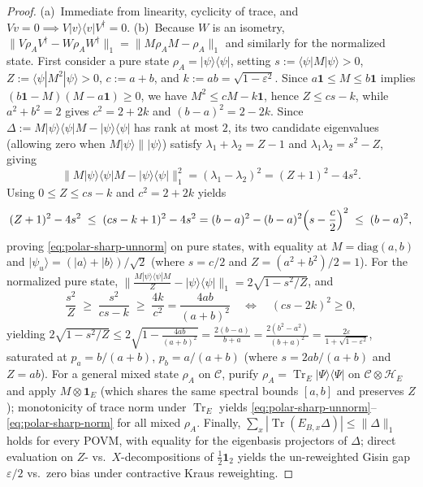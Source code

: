 \documentclass[11pt,a4paper]{article}
\theoremstyle{definition}
\theoremstyle{remark}
\newcommand{\Tr}{\operatorname{Tr}}
\newcommand{\cH}{\mathcal{H}}
\newcommand{\cC}{\mathcal{C}}
\newcommand{\1}{\mathbf{1}}
\newcommand{\normTr}[1]{\|#1\|_1}
\begin{document}
\begin{proof}
(a)~Immediate from linearity, cyclicity of trace, and $V v = 0\implies V|v\rangle\langle v|V^\dagger=0$.
(b)~Because $W$ is an isometry, $\normTr{V\rho_A V^\dagger - W\rho_A W^\dagger}=\normTr{M\rho_A M - \rho_A}$ and similarly for the normalized state. First consider a pure state $\rho_A=|\psi\rangle\langle\psi|$, setting $s:=\langle\psi|M|\psi\rangle>0$, $Z:=\langle\psi|M^2|\psi\rangle>0$, $c:=a+b$, and $k:=ab=\sqrt{1-\varepsilon^2}$. Since $a\1\le M\le b\1$ implies $(b\1-M)(M-a\1)\ge 0$, we have $M^2\le c M - k\1$, hence $Z\le c s - k$, while $a^2+b^2=2$ gives $c^2=2+2k$ and $(b-a)^2=2-2k$. Since $\Delta:=M|\psi\rangle\langle\psi|M-|\psi\rangle\langle\psi|$ has rank at most $2$, its two candidate eigenvalues (allowing zero when $M|\psi\rangle\parallel|\psi\rangle$) satisfy $\lambda_1+\lambda_2=Z-1$ and $\lambda_1\lambda_2 = s^2 - Z$, giving
\begin{equation*}
  \normTr{M|\psi\rangle\langle\psi|M - |\psi\rangle\langle\psi|}^2
  = (\lambda_1-\lambda_2)^2 = (Z+1)^2 - 4 s^2.
\end{equation*}
Using $0\le Z\le c s - k$ and $c^2=2+2k$ yields
\begin{equation*}
  (Z+1)^2 - 4 s^2 \;\le\; (c s - k + 1)^2 - 4 s^2
  = (b-a)^2 - (b-a)^2\Bigl(s-\frac{c}{2}\Bigr)^2 \;\le\; (b-a)^2,
\end{equation*}
proving \eqref{eq:polar-sharp-unnorm} on pure states, with equality at $M=\mathrm{diag}(a,b)$ and $|\psi_u\rangle=(|a\rangle+|b\rangle)/\sqrt{2}$ (where $s=c/2$ and $Z=(a^2+b^2)/2=1$). For the normalized pure state, $\normTr{\frac{M|\psi\rangle\langle\psi|M}{Z}-|\psi\rangle\langle\psi|}=2\sqrt{1-s^2/Z}$, and
\begin{equation*}
  \frac{s^2}{Z} \;\ge\; \frac{s^2}{c s - k} \;\ge\; \frac{4k}{c^2} = \frac{4ab}{(a+b)^2}
  \quad\Longleftrightarrow\quad
  (c s - 2k)^2 \ge 0,
\end{equation*}
yielding $2\sqrt{1-s^2/Z}\le 2\sqrt{1-\frac{4ab}{(a+b)^2}}=\frac{2(b-a)}{b+a}=\frac{2(b^2-a^2)}{(b+a)^2}=\frac{2\varepsilon}{1+\sqrt{1-\varepsilon^2}}$, saturated at $p_a=b/(a+b)$, $p_b=a/(a+b)$ (where $s=2ab/(a+b)$ and $Z=ab$). For a general mixed state $\rho_A$ on $\cC$, purify $\rho_A=\Tr_E|\Psi\rangle\langle\Psi|$ on $\cC\otimes\cH_E$ and apply $M\otimes\1_E$ (which shares the same spectral bounds $[a,b]$ and preserves $Z$); monotonicity of trace norm under $\Tr_E$ yields \eqref{eq:polar-sharp-unnorm}--\eqref{eq:polar-sharp-norm} for all mixed $\rho_A$. Finally, $\sum_x|\Tr(E_{B,x}\Delta)|\le\normTr{\Delta}$ holds for every POVM, with equality for the eigenbasis projectors of $\Delta$; direct evaluation on $Z$- vs.\ $X$-decompositions of $\frac{1}{2}\1_2$ yields the un-reweighted Gisin gap $\varepsilon/2$ vs.\ zero bias under contractive Kraus reweighting.

\end{proof}
\end{document}
